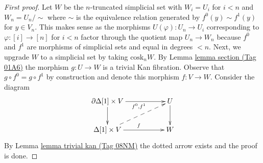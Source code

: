 \documentclass{amsart}
\theoremstyle{plain}
\theoremstyle{definition}
\theoremstyle{remark}
\numberwithin{equation}{subsection}
\begin{document}
\begin{proof}[First proof]
Let $W$ be the $n$-truncated simplicial set with $W_i = U_i$ for
$i < n$ and $W_n = U_n / \sim$ where $\sim$ is the equivalence relation
generated by $f^0(y) \sim f^1(y)$ for $y \in V_n$. This makes sense
as the morphisms $U(\varphi) : U_n \to U_i$ corresponding to
$\varphi : [i] \to [n]$ for $i < n$ factor through the quotient map
$U_n \to W_n$ because $f^0$ and $f^1$ are morphisms of simplicial sets and
equal in degrees $< n$. Next, we upgrade $W$ to a simplicial set
by taking $\text{cosk}_n W$. By Lemma \href{https://stacks.math.columbia.edu/tag/01A6}{lemma section (Tag 01A6)}
the morphism $g : U \to W$ is a trivial Kan fibration. Observe
that $g \circ f^0 = g \circ f^1$ by construction and denote
this morphism $f : V \to W$. Consider the diagram
$$
\xymatrix{
\partial \Delta[1] \times V \ar[rr]_{f^0, f^1} \ar[d] & & U \ar[d] \\
\Delta[1] \times V \ar[rr]^f \ar@{-->}[rru] & & W
}
$$
By Lemma \href{https://stacks.math.columbia.edu/tag/08NM}{lemma trivial kan (Tag 08NM)} the dotted arrow exists and the proof is done.
\end{proof}
\end{document}

